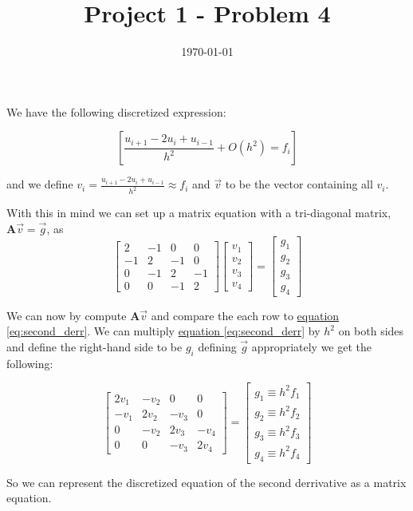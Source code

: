 \documentclass[english,notitlepage]{article}  %
\begin{document}
\title{Project 1 - Problem 4}
\date{\today}

\maketitle

We have the following discretized expression:

\begin{equation}\label{eq:second_derr}
    \left[\frac{u_{i+1} - 2u_i + u_{i-1}}{h^2} + O(h^2) = f_i\right]
\end{equation}

and we define $v_i = \frac{u_{i+1} - 2u_i + u_{i-1}}{h^2} \approx f_i$ and $\vec{v}$ to be the vector containing all $v_i$.

With this in mind we can set up a matrix equation with a tri-diagonal matrix, $\boldsymbol{A}\vec{v} = \vec{g}$, as
\begin{equation}\label{eq:mat_Avg}
    \begin{bmatrix}
        2 & -1 & 0 & 0 \\
        -1 & 2 & -1 & 0 \\
        0 & -1 & 2 & -1 \\
        0 & 0 & -1 & 2
    \end{bmatrix} \begin{bmatrix}
        v_1\\
        v_2\\
        v_3\\
        v_4
    \end{bmatrix} = \begin{bmatrix}
        g_1\\
        g_2\\
        g_3\\
        g_4
    \end{bmatrix}
\end{equation}

We can now by compute $\boldsymbol{A}\vec{v}$ and compare the each row to \hyperref[eq:second_derr]{equation \ref*{eq:second_derr}}. We can multiply \hyperref[eq:second_derr]{equation \ref*{eq:second_derr}} by $h^2$ on both sides and define the right-hand side to be $g_i$ defining $\vec{g}$ appropriately we get the following:

\begin{equation}\label{eq:mat_Vhf}
    \begin{bmatrix}
        2v_1 & -v_2 & 0 & 0 \\
        -v_1 & 2v_2 & -v_3 & 0 \\
        0 & -v_2 & 2v_3 & -v_4 \\
        0 & 0 & -v_3 & 2v_4
    \end{bmatrix} = \begin{bmatrix}
        g_1 \equiv h^2 f_1\\
        g_2 \equiv h^2 f_2\\
        g_3 \equiv h^2 f_3\\
        g_4 \equiv h^2 f_4
    \end{bmatrix}
\end{equation}

So we can represent the discretized equation of the second derrivative as a matrix equation.
\end{document}

